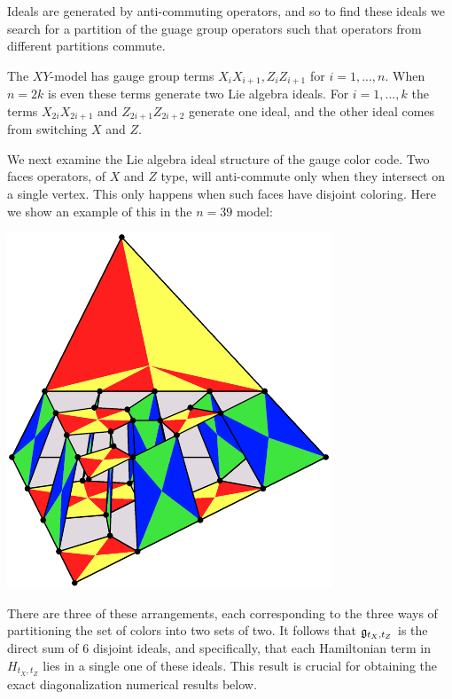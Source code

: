 Ideals are generated by anti-commuting operators,
and so to find these ideals we search for a partition of
the guage group operators such that operators from
different partitions commute.

The $XY$-model has gauge group
terms $X_i X_{i+1}, Z_i Z_{i+1}$ for $i=1,...,n.$
When $n=2k$ is even 
these terms generate two Lie algebra ideals.
For $i=1,...,k$
the terms $X_{2i}X_{2i+1}$ and $Z_{2i+1}Z_{2i+2}$ 
generate one ideal, and the other ideal comes from switching $X$ and $Z.$

We next examine the Lie algebra ideal structure of the gauge color code.
Two faces operators, of $X$ and $Z$ type,
will anti-commute only when
they intersect on a single vertex.
This only happens when such faces have disjoint coloring.
Here we show an example of this in the $n=39$ model:
\begin{center}
\includegraphics{pic-gcolor-ideal.pdf}
\end{center}
There are three of these arrangements,
each corresponding to the three ways of
partitioning the set of colors into two sets of two.
It follows that $\mathfrak{g}_{t_X,t_Z}$ 
is the direct sum of 6 disjoint ideals,
and specifically, that each Hamiltonian term in $H_{t_X,t_Z}$
lies in a single one of these ideals.
This result is crucial for obtaining the exact
diagonalization numerical results below.


